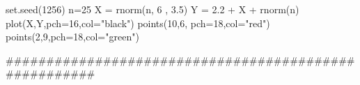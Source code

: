 
set.seed(1256)
n=25
X = rnorm(n, 6 , 3.5)
Y = 2.2 + X + rnorm(n)
plot(X,Y,pch=16,col="black")
points(10,6, pch=18,col="red")
points(2,9,pch=18,col="green")

######################################################
